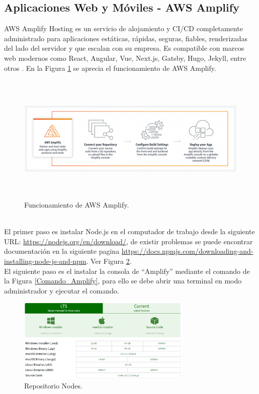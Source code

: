 \documentclass[a4paper,10pt, oneside, titlepage]{article}
\begin{document}
	\subsection{Aplicaciones Web y Móviles - AWS Amplify}
	AWS Amplify Hosting es un servicio de alojamiento y CI/CD completamente administrado para aplicaciones estáticas, rápidas, seguras, fiables, renderizadas del lado del servidor y que escalan con su empresa. Es compatible con marcos web modernos como React, Angular, Vue, Next.js, Gatsby, Hugo, Jekyll, entre otros \cite{Amplify}. En la Figura \ref{Funcionamiento_Amplify} se aprecia el funcionamiento de AWS Amplify.
	\begin{figure}[!h]
		\centering
		\includegraphics[width = 1\linewidth, height = 6.2cm]{Funcionamiento_Amplify.png}
		\caption{Funcionamiento de AWS Amplify.}
		\label{Funcionamiento_Amplify}
	\end{figure} \\
	\indent El primer paso es instalar Node.js en el computador de trabajo desde la siguiente URL: \textcolor{blue}{\url{https://nodejs.org/en/download/}}, de existir problemas se puede encontrar documentación en la siguiente pagina \textcolor{blue}{\url{https://docs.npmjs.com/downloading-and-installing-node-js-and-npm}}. Ver Figura \ref{Repositorio_Nodes}. \\\newline
	\indent El siguiente paso es el instalar la consola de ``Amplify'' mediante el comando de la Figura \ref{Comando_Amplify}, para ello se debe abrir una terminal en modo administrador y ejecutar el comando.
	\begin{figure}[!h]
		\centering
		\includegraphics[width = 1\linewidth, height = 4cm]{Repositorio_Nodes.png}
		\caption{Repositorio Nodes.}
		\label{Repositorio_Nodes}
	\end{figure} \\
\end{document}
